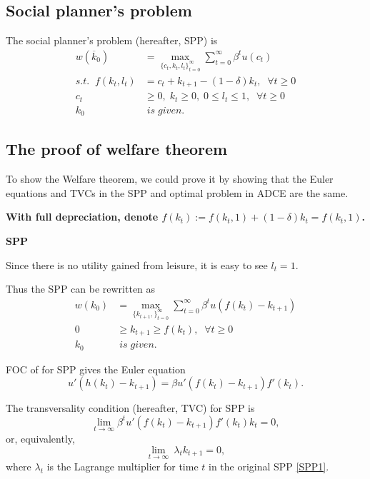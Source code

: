 \documentclass[12pt,notitlepage]{article}%
\numberwithin{equation}{section}
\begin{document}
\subsection{Social planner's problem}
		The  social planner's problem (hereafter, SPP) is
			\begin{equation}\label{SPP1}
			\begin{split}
			w(\overline k_0)&=\max_{\{c_t, k_t, l_t \}_{t=0}^{\infty}}
			\sum_{t=0}^{\infty}\beta^tu(c_t)\\
			s.t. \;\;f(k_t,l_t)&=c_t+k_{t+1}-(1-\delta)k_t,	\;\;\forall t\geq 0\\
			c_t&\geq0,\;k_t\geq0,\;0\leq l_t\leq 1,  \;\;\forall t\geq 0\\
		k_0& \;is\; given. 
				\end{split}
			\end{equation}


\subsection{The proof of welfare theorem}



To show the Welfare theorem, we could prove it by showing that the Euler equations and TVCs in the SPP and optimal problem in ADCE are the same. 

\textbf{With full depreciation, denote $f(k_t):=f(k_t,1)+(1-\delta)k_t=f(k_t,1)$.}

\textbf{SPP}

Since there is no utility gained from leisure, it is easy to see $l_t=1$. 

 Thus the SPP can be rewritten as
	\begin{equation*}
\begin{split}
w( k_0)&=\max_{\{ k_{t+1}, \}_{t=0}^{\infty}}
\sum_{t=0}^{\infty}\beta^tu(f(k_t)-k_{t+1})\\
0&\geq k_{t+1}\geq f(k_t),  \;\;\forall t\geq 0\\
k_0& \;is\; given. 
\end{split}
\end{equation*}

FOC of  for SPP  gives the Euler equation
\begin{equation}
u'(h(k_t)-k_{t+1})=\beta u'(f(k_t)-k_{t+1})f'(k_t). 
\end{equation}

The transversality condition (hereafter, TVC) for SPP is
\begin{equation}\label{EularSPP}
\lim_{t\to \infty}\beta^t u'(f(k_t)-k_{t+1})f'(k_t)k_t=0,
\end{equation}
or, equivalently, 
\begin{equation}\label{TVCspp}
\lim_{t\to \infty}\ \lambda_tk_{t+1}=0,
\end{equation}
where  $\lambda_t$ is the Lagrange multiplier for time $t$ in the original SPP \ref{SPP1}. 
\end{document}
